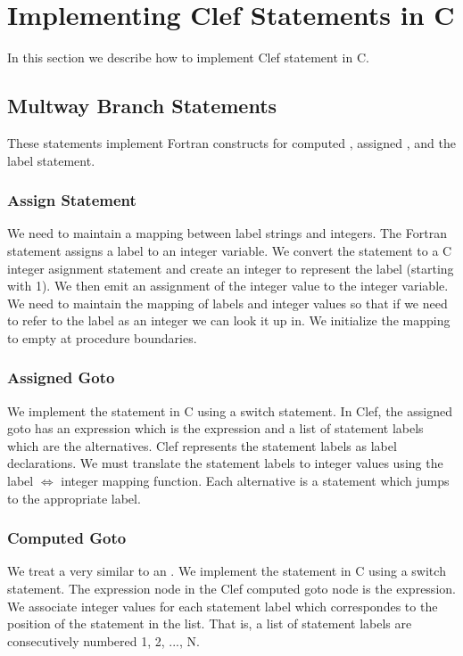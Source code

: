 \section{Implementing Clef Statements in C}

In this section we describe how to implement Clef statement
in C.

\subsection{Mult\-way Branch Statements}

These statements implement Fortran constructs for computed ,
assigned , and the  label statement.

\subsubsection{Assign Statement}

We need to maintain a mapping between label strings and integers.  The
Fortran  statement assigns a label to an integer variable.
We convert the  statement to a C integer asignment
statement and create an integer to represent the label (starting with
1).  We then emit an assignment of the integer value to the integer
variable.  We need to maintain the mapping of labels and integer
values so that if we need to refer to the label as an integer we can
look it up in.  We initialize the mapping to empty at procedure
boundaries.

\subsubsection{Assigned Goto}

We implement the  statement in C using a switch
statement.  In Clef, the assigned goto has an expression which is the
 expression and a list of statement labels which
are the  alternatives.  Clef represents the statement labels 
as label declarations. We must translate the statement labels
to integer values using the label $\Leftrightarrow$ integer
mapping function.  Each  alternative is a 
statement which jumps to the appropriate label.

\subsubsection{Computed Goto}

We treat a  very similar to an . We implement the  statement in C using a
switch statement.  The expression node in the Clef computed
goto node is the  expression.  We associate
integer values for each statement label which correspondes
to the position of the statement in the list.  That is,
a list of statement labels 
are consecutively numbered 1, 2, ..., N.

